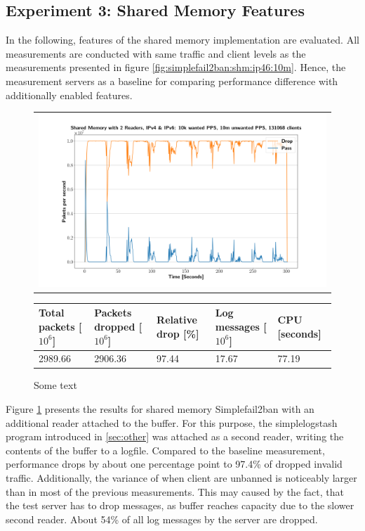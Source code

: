 \subsection{Experiment 3: Shared Memory Features}

In the following, features of the shared memory implementation are evaluated. All measurements are conducted with same traffic and client levels as the measurements presented in figure \ref{fig:simplefail2ban:shm:ip46:10m}.
Hence, the measurement servers as a baseline for comparing performance difference with additionally enabled features.

\begin{figure}[!h]
	\centering
	\scriptsize
	\begin{tabular}{c}
    	\centerline{\includegraphics[width=1.2\textwidth]{images/simplefail2ban_shm_2r_ipv46_v10k_iv10m_c131068.png}}
	\end{tabular}
	\begin{tabular}{lllll}
		\toprule
		\textbf{Total packets [$10^6$]} & \textbf{Packets dropped [$10^6$]} & \textbf{Relative drop [\%]} & \textbf{Log messages [$10^6$]} & \textbf{CPU [seconds]} \\ \midrule 
		2989.66 & 2906.36 & 97.44 & 17.67 & 77.19 \\
		\bottomrule
	\end{tabular}
	\caption[Simplefail2ban, Shared Memory 2 Readers]{Some text}
	\label{fig:simplefail2ban:shm:2r}
\end{figure}

Figure \ref{fig:simplefail2ban:shm:2r} presents the results for shared memory Simplefail2ban with an additional reader attached to the buffer. For this purpose, the simplelogstash
program introduced in \ref{sec:other} was attached as a second reader, writing the contents of the buffer to a logfile. Compared to the baseline measurement, performance drops by about one percentage
point to 97.4\% of dropped invalid traffic. Additionally, the variance of when client are unbanned is noticeably larger
than in most of the previous measurements. This may caused by the fact, that the test server has to drop messages, as buffer reaches capacity due to the slower second reader.
About 54\% of all log messages by the server are dropped.   

